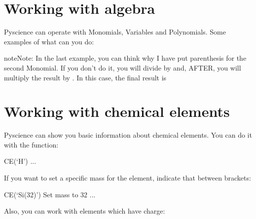 \documentclass[letterpaper,10pt,english]{sphinxmanual}
\begin{document}
\section{Working with algebra}
\label{\detokenize{user_guide:working-with-algebra}}
Pyscience can operate with Monomials, Variables and Polynomials. Some examples of
what can you do:

\begin{sphinxVerbatim}[commandchars=\\\{\}]
   
   
   
\end{sphinxVerbatim}

\begin{sphinxadmonition}{note}{Note:}
In the last example, you can think why I have put parenthesis for the second Monomial. If you don’t do it, you will divide  by  and, AFTER, you will multiply the result by . In this case, the final result is 
\end{sphinxadmonition}


\section{Working with chemical elements}
\label{\detokenize{user_guide:working-with-chemical-elements}}
Pyscience can show you basic information about chemical elements. You can do it
with the  function:

\begin{sphinxVerbatim}[commandchars=\\\{\}]
\PYGZgt{} CE(‘H’)
...
\end{sphinxVerbatim}

If you want to set a specific mass for the element, indicate that between brackets:

\begin{sphinxVerbatim}[commandchars=\\\{\}]
\PYGZgt{} CE(‘Si(32)’) \PYGZsh{} Set mass to 32
...
\end{sphinxVerbatim}

Also, you can work with elements which have charge:
\end{document}
